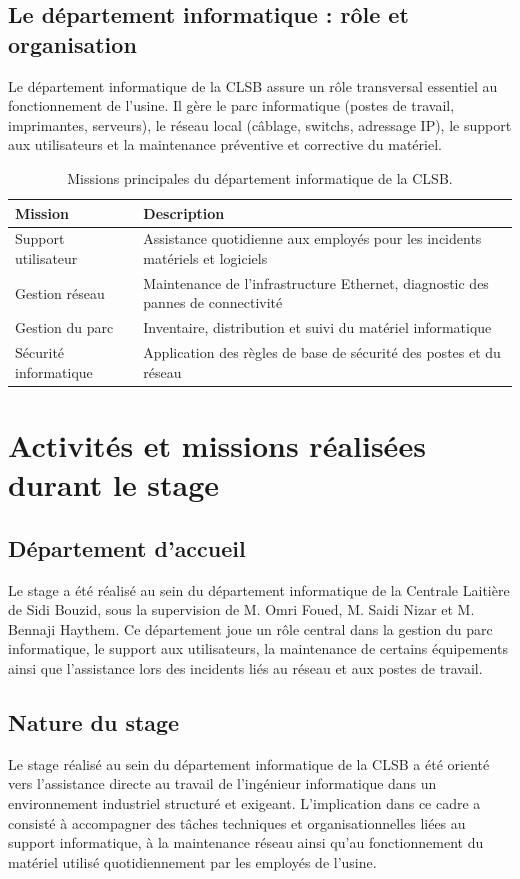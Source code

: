 \documentclass[12pt,a4paper,oneside]{report}
\begin{document}
\section{Le département informatique : rôle et organisation}
Le département informatique de la CLSB assure un rôle transversal essentiel au fonctionnement de l'usine. Il gère le parc informatique (postes de travail, imprimantes, serveurs), le réseau local (câblage, switchs, adressage IP), le support aux utilisateurs et la maintenance préventive et corrective du matériel.

\begin{table}[H]\centering
\begin{tabular}{|l|p{8.5cm}|}
\hline
\textbf{Mission} & \textbf{Description} \\
\hline
Support utilisateur & Assistance quotidienne aux employés pour les incidents matériels et logiciels \\
\hline
Gestion réseau & Maintenance de l'infrastructure Ethernet, diagnostic des pannes de connectivité \\
\hline
Gestion du parc & Inventaire, distribution et suivi du matériel informatique \\
\hline
Sécurité informatique & Application des règles de base de sécurité des postes et du réseau \\
\hline
\end{tabular}
\caption{Missions principales du département informatique de la CLSB.}
\end{table}

\chapter{Activités et missions réalisées durant le stage}

\section*{Département d'accueil}
Le stage a été réalisé au sein du département informatique de la Centrale Laitière de Sidi Bouzid, sous la supervision de M. Omri Foued, M. Saidi Nizar et M. Bennaji Haythem. Ce département joue un rôle central dans la gestion du parc informatique, le support aux utilisateurs, la maintenance de certains équipements ainsi que l'assistance lors des incidents liés au réseau et aux postes de travail.

\section{Nature du stage}
Le stage réalisé au sein du département informatique de la CLSB a été orienté vers l'assistance directe au travail de l'ingénieur informatique dans un environnement industriel structuré et exigeant. L'implication dans ce cadre a consisté à accompagner des tâches techniques et organisationnelles liées au support informatique, à la maintenance réseau ainsi qu'au fonctionnement du matériel utilisé quotidiennement par les employés de l'usine.
\end{document}
